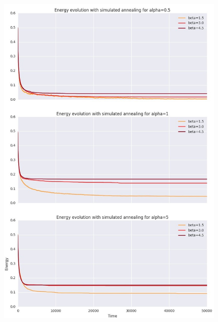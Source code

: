 \documentclass[twocolumn]{article}
\begin{document}
\begin{figure}[!h]
	\includegraphics[width=\columnwidth]{../tobekept/skype_2.jpg}
\end{figure}
\end{document}

